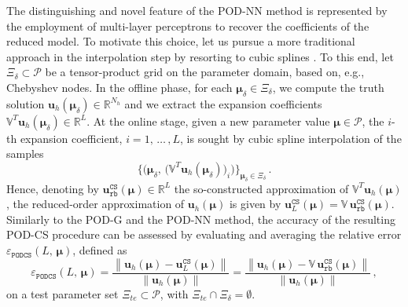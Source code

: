 \documentclass{elsarticle}
\numberwithin{equation}{section}
\theoremstyle{theorem}
\theoremstyle{definition}
\theoremstyle{remark}
\theoremstyle{proposition}
\numberwithin{figure}{section}
\newcommand{\norm}[1]{\left\lVert#1\right\rVert}
\newcommand{\bg}[1]{\boldsymbol{#1}}
\begin{document}
		The distinguishing and novel feature of the POD-NN method is represented by the employment of multi-layer perceptrons to recover the coefficients of the reduced model. To motivate this choice, let us pursue a more traditional approach in the interpolation step by resorting to cubic splines \cite{Deb78}. To this end, let $\Xi_{\delta} \subset \mathcal{P}$ be a tensor-product grid on the parameter domain, based on, e.g., Chebyshev nodes. %
		In the offline phase, for each $\bg{\mu}_{\delta} \in \Xi_{\delta}$, we compute the truth solution $\mathbf{u}_h(\bg{\mu}_{\delta}) \in \mathbb{R}^{N_h}$ and we extract the expansion coefficients $\mathbb{V}^T \mathbf{u}_h(\bg{\mu}_{\delta}) \in \mathbb{R}^L$. At the online stage, given a new parameter value $\bg{\mu} \in \mathcal{P}$, the $i$-th expansion coefficient, $i = 1, \, \ldots \, , L$, is sought by cubic spline interpolation of the samples \[ \big\lbrace \big( \bg{\mu}_{\delta}, \, \big( \mathbb{V}^T \mathbf{u}_h(\bg{\mu}_{\delta}) \big)_i \big) \big\rbrace_{\bg{\mu}_{\delta} \in \Xi_{\delta}} \, . \] Hence, denoting by $\mathbf{u}_{\texttt{rb}}^{\texttt{CS}}(\bg{\mu}) \in \mathbb{R}^L$ the so-constructed approximation of $\mathbb{V}^T \mathbf{u}_h(\bg{\mu})$, the reduced-order approximation of $\mathbf{u}_h(\bg{\mu})$ is given by $\mathbf{u}_L^{\texttt{CS}}(\bg{\mu}) = \mathbb{V} \, \mathbf{u}_{\texttt{rb}}^{\texttt{CS}}(\bg{\mu})$. Similarly to the POD-G and the POD-NN method, the accuracy of the resulting POD-CS procedure can be assessed by evaluating and averaging the relative error $\varepsilon_{\texttt{PODCS}}^{}(L, \, \bg{\mu})$, defined as
		\begin{equation*}
			\label{eq:podcs-error}
			\varepsilon_{\texttt{PODCS}}^{}(L, \, \bg{\mu}) = \dfrac{\norm{\mathbf{u}_h(\bg{\mu}) - \mathbf{u}_L^{\texttt{CS}}(\bg{\mu})}}{\norm{\mathbf{u}_h(\bg{\mu})}} = \dfrac{\norm{\mathbf{u}_h(\bg{\mu}) - \mathbb{V} \, \mathbf{u}_{\texttt{rb}}^{\texttt{CS}}(\bg{\mu})}}{\norm{\mathbf{u}_h(\bg{\mu})}} \, ,
		\end{equation*}
		on a test parameter set $\Xi_{te} \subset \mathcal{P}$, with $\Xi_{te} \cap \Xi_{\delta} = \emptyset$.
				
\end{document}
